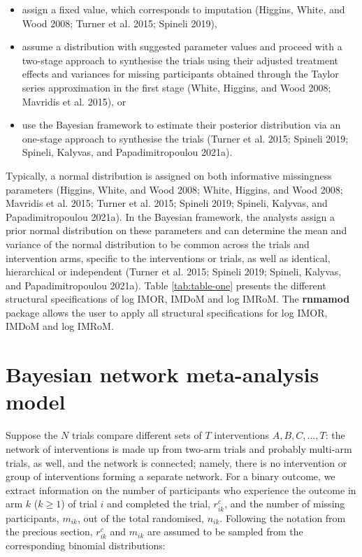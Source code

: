 \begin{itemize}
\tightlist
\item
  assign a fixed value, which corresponds to imputation (Higgins, White, and Wood 2008; Turner et al. 2015; Spineli 2019),
\item
  assume a distribution with suggested parameter values and proceed with a two-stage
  approach to synthesise the trials using their adjusted treatment effects and variances
  for missing participants obtained through the Taylor series approximation in the
  first stage (White, Higgins, and Wood 2008; Mavridis et al. 2015), or
\item
  use the Bayesian framework to estimate their posterior distribution via an one-stage
  approach to synthesise the trials (Turner et al. 2015; Spineli 2019; Spineli, Kalyvas, and Papadimitropoulou 2021a).
\end{itemize}

Typically, a normal distribution is assigned on both informative missingness parameters
(Higgins, White, and Wood 2008; White, Higgins, and Wood 2008; Mavridis et al. 2015; Turner et al. 2015; Spineli 2019; Spineli, Kalyvas, and Papadimitropoulou 2021a).
In the Bayesian framework, the analysts assign a prior normal distribution on these
parameters and can determine the mean and variance of the normal distribution to
be common across the trials and intervention arms, specific to the interventions or
trials, as well as identical, hierarchical or independent (Turner et al. 2015; Spineli 2019; Spineli, Kalyvas, and Papadimitropoulou 2021a). Table
\ref{tab:table-one} presents the different structural specifications of
log IMOR, IMDoM and log IMRoM. The \textbf{rnmamod} package allows the user to apply
all structural specifications for log IMOR, IMDoM and log IMRoM.

\hypertarget{bayesian-network-meta-analysis-model}{%
\section{Bayesian network meta-analysis model}\label{bayesian-network-meta-analysis-model}}

Suppose the \(N\) trials compare different sets of \(T\) interventions \({A, B, C,..., T}\):
the network of interventions is made up from two-arm trials and probably
multi-arm trials, as well, and the network is connected; namely, there is no
intervention or group of interventions forming a separate network. For a binary
outcome, we extract information on the number of participants who experience the
outcome in arm \(k\) (\(k \ge 1\)) of trial \(i\) and completed the trial, \(r^{c}_{ik}\),
and the number of missing participants, \(m_{ik}\), out of the total randomised,
\(n_{ik}\). Following the notation from the precious section, \(r^{c}_{ik}\) and \(m_{ik}\)
are assumed to be sampled from the corresponding binomial distributions:

